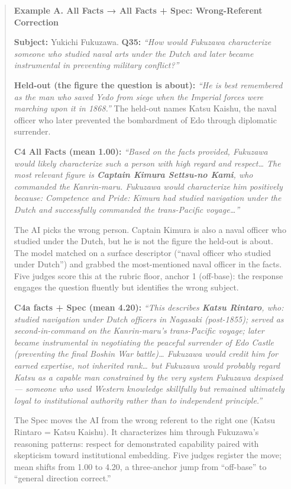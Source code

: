 \begin{quote}
\textbf{Example A. All Facts → All Facts + Spec: Wrong-Referent
Correction}

\textbf{Subject:} Yukichi Fukuzawa. \textbf{Q35:} \emph{``How would
Fukuzawa characterize someone who studied naval arts under the Dutch and
later became instrumental in preventing military conflict?''}

\textbf{Held-out (the figure the question is about):} \emph{``He is best
remembered as the man who saved Yedo from siege when the Imperial forces
were marching upon it in 1868.''} The held-out names Katsu Kaishu, the
naval officer who later prevented the bombardment of Edo through
diplomatic surrender.

\textbf{C4 All Facts (mean 1.00):} \emph{``Based on the facts provided,
Fukuzawa would likely characterize such a person with high regard and
respect\ldots{} The most relevant figure is \textbf{Captain Kimura
Settsu-no Kami}, who commanded the Kanrin-maru. Fukuzawa would
characterize him positively because: Competence and Pride: Kimura had
studied navigation under the Dutch and successfully commanded the
trans-Pacific voyage\ldots{}''}

The AI picks the wrong person. Captain Kimura is also a naval officer
who studied under the Dutch, but he is not the figure the held-out is
about. The model matched on a surface descriptor (``naval officer who
studied under Dutch'') and grabbed the most-mentioned naval officer in
the facts. Five judges score this at the rubric floor, anchor 1
(off-base): the response engages the question fluently but identifies
the wrong subject.

\textbf{C4a facts + Spec (mean 4.20):} \emph{``This describes
\textbf{Katsu Rintaro}, who: studied navigation under Dutch officers in
Nagasaki (post-1855); served as second-in-command on the Kanrin-maru's
trans-Pacific voyage; later became instrumental in negotiating the
peaceful surrender of Edo Castle (preventing the final Boshin War
battle)\ldots{} Fukuzawa would credit him for earned expertise, not
inherited rank\ldots{} but Fukuzawa would probably regard Katsu as a
capable man constrained by the very system Fukuzawa despised --- someone
who used Western knowledge skillfully but remained ultimately loyal to
institutional authority rather than to independent principle.''}

The Spec moves the AI from the wrong referent to the right one (Katsu
Rintaro = Katsu Kaishu). It characterizes him through Fukuzawa's
reasoning patterns: respect for demonstrated capability paired with
skepticism toward institutional embedding. Five judges register the
move; mean shifts from 1.00 to 4.20, a three-anchor jump from
``off-base'' to ``general direction correct.''


\end{quote}
